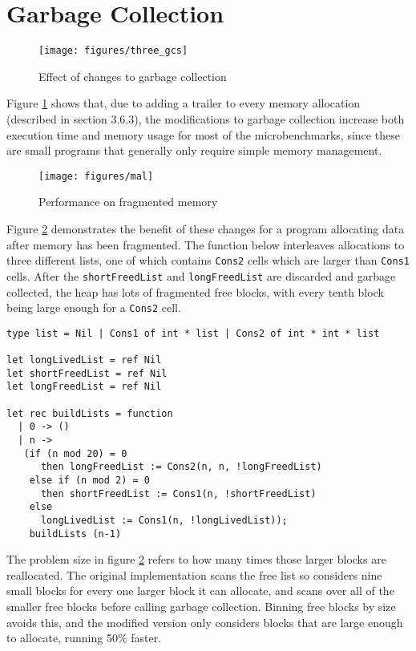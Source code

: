 

\section{Garbage Collection}
\vspace{-0.5cm}
\begin{figure}[H]
\hspace{-2.8cm}
\texttt{[image: figures/three\_gcs]}
\vspace{-0.6cm}
\caption{Effect of changes to garbage collection}
 \label{fig:three_gcs} 
\end{figure}

Figure \ref{fig:three_gcs} shows that, due to adding a trailer to every memory allocation (described in section 3.6.3), the modifications to garbage collection increase both execution time and memory usage for most of the microbenchmarks, since these are small programs that generally only require simple memory management. 

\begin{figure}[H]
\hfill \texttt{[image: figures/mal]} \hfill
\caption{Performance on fragmented memory}
 \label{fig:mal} 
\end{figure}

Figure \ref{fig:mal} demonstrates the benefit of these changes for a program allocating data after memory has been fragmented. The function below interleaves allocations to three different lists, one of which contains \verb|Cons2| cells which are larger than \verb|Cons1| cells. After the \verb|shortFreedList| and \verb|longFreedList| are discarded and garbage collected, the heap has lots of fragmented free blocks, with every tenth block being large enough for a \verb|Cons2| cell. 
\begin{verbatim}
type list = Nil | Cons1 of int * list | Cons2 of int * int * list

let longLivedList = ref Nil
let shortFreedList = ref Nil
let longFreedList = ref Nil

let rec buildLists = function
  | 0 -> ()
  | n ->
   (if (n mod 20) = 0
      then longFreedList := Cons2(n, n, !longFreedList)
    else if (n mod 2) = 0
      then shortFreedList := Cons1(n, !shortFreedList)
    else 
      longLivedList := Cons1(n, !longLivedList));
    buildLists (n-1)
\end{verbatim}
The problem size in figure \ref{fig:mal} refers to how many times those larger blocks are reallocated. The original implementation scans the free list so considers nine small blocks for every one larger block it can allocate, and scans over all of the smaller free blocks before calling garbage collection. Binning free blocks by size avoids this, and the modified version only considers blocks that are large enough to allocate, running 50\% faster. 

